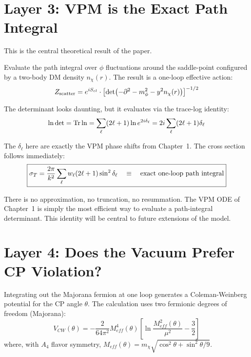 \section{Layer 3: VPM is the Exact Path Integral}
\label{ch2:vpm_pi}

This is the central theoretical result of the paper.

Evaluate the path integral over $\phi$ fluctuations around the saddle-point
configured by a two-body DM density $n_\chi(r)$. The result is a
one-loop effective action:
\begin{equation}
  Z_{\rm scatter} = e^{iS_{cl}} \cdot
  \left[\det\!\left(-\partial^2 - m_\phi^2 - y^2 n_\chi(r)\right)\right]^{-1/2}
\end{equation}

The determinant looks daunting, but it evaluates via the trace-log identity:
\begin{equation}
  \ln\det = {\rm Tr}\ln = \sum_\ell (2\ell+1)\ln e^{2i\delta_\ell}
           = 2i\sum_\ell(2\ell+1)\delta_\ell
\end{equation}

The $\delta_\ell$ here are exactly the VPM phase shifts from Chapter~1.
The cross section follows immediately:
\begin{equation}
  \boxed{\sigma_T = \frac{2\pi}{k^2}\sum_\ell w_\ell(2\ell+1)\sin^2\delta_\ell
  \quad\equiv\quad \text{exact one-loop path integral}}
\end{equation}

There is no approximation, no truncation, no resummation.
The VPM ODE of Chapter~1 is simply the most efficient way to
evaluate a path-integral determinant. This identity will be central
to future extensions of the model.

\section{Layer 4: Does the Vacuum Prefer CP Violation?}
\label{ch2:cw}

Integrating out the Majorana fermion at one loop generates a Coleman-Weinberg
potential for the CP angle $\theta$. The calculation uses two fermionic
degrees of freedom (Majorana):
\begin{equation}
  V_{CW}(\theta) = -\frac{2}{64\pi^2}M_{eff}^4(\theta)
  \left[\ln\frac{M_{eff}^2(\theta)}{\mu^2} - \frac{3}{2}\right]
\end{equation}
where, with $A_4$ flavor symmetry, $M_{eff}(\theta) = m_\chi\sqrt{\cos^2\theta + \sin^2\theta/9}$.

